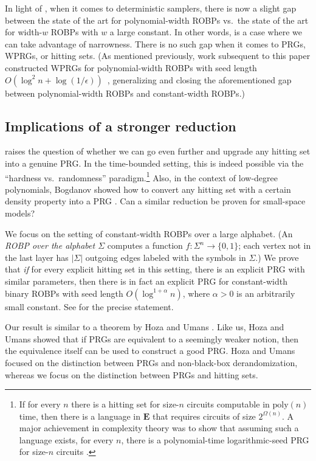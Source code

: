 In light of , when it comes to deterministic samplers, there is now a slight gap between the state of the art for polynomial-width ROBPs vs.\ the state of the art for width-$w$ ROBPs with $w$ a large constant. In other words,  is a case where we can take advantage of narrowness. There is no such gap when it comes to PRGs, WPRGs, or hitting sets. (As mentioned previously, work subsequent to this paper constructed WPRGs for polynomial-width ROBPs with seed length $O(\log^2 n + \log(1/\epsilon))$~\cite{CDRSTS21,PV21,Hoz21}, generalizing  and closing the aforementioned gap between polynomial-width ROBPs and constant-width ROBPs.)


\subsection{Implications of a stronger reduction}
 raises the question of whether we can go even further and upgrade any hitting set into a genuine PRG. In the time-bounded setting, this is indeed possible via the ``hardness vs.\ randomness'' paradigm.\footnote{If for every $n$ there is a hitting set for size-$n$ circuits computable in $\text{poly}(n)$ time, then there is a language in $\mathbf{E}$ that requires circuits of size $2^{\Omega(n)}$. A major achievement in complexity theory was to show that assuming such a language exists, for every $n$, there is a polynomial-time logarithmic-seed PRG for size-$n$ circuits \cite{IW97}.} Also, in the context of low-degree polynomials, Bogdanov showed how to convert any hitting set with a certain density property into a PRG \cite{Bog05}. Can a similar reduction be proven for small-space models?

We focus on the setting of constant-width ROBPs over a large alphabet. (An \emph{ROBP over the alphabet $\Sigma$} computes a function $f \colon \Sigma^n \to \{0, 1\}$; each vertex not in the last layer has $|\Sigma|$ outgoing edges labeled with the symbols in $\Sigma$.) We prove that \emph{if} for every explicit hitting set in this setting, there is an explicit PRG with similar parameters, then there is in fact an explicit PRG for constant-width binary ROBPs with seed length $O(\log^{1 + \alpha} n)$, where $\alpha > 0$ is an arbitrarily small constant. See  for the precise statement.

Our result is similar to a theorem by Hoza and Umans \cite{HU22}. Like us, Hoza and Umans showed that if PRGs are equivalent to a seemingly weaker notion, then the equivalence itself can be used to construct a good PRG. Hoza and Umans focused on the distinction between PRGs and non-black-box derandomization, whereas we focus on the distinction between PRGs and hitting sets.

